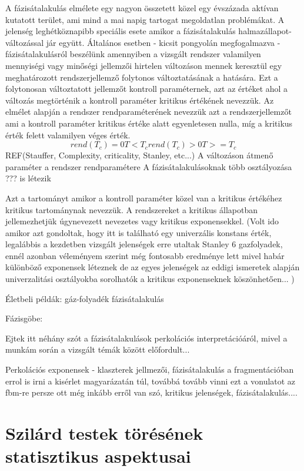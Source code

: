 A fázisátalakulás elmélete egy nagyon összetett közel egy évszázada aktívan kutatott terület, ami mind a mai napig tartogat megoldatlan problémákat. A jelenség leghétköznapibb speciális esete amikor a fázisátalakulás halmazállapot-változással jár együtt. Általános esetben - kicsit pongyolán megfogalmazva - fázisátalakulásról beszélünk amennyiben a vizsgált rendszer valamilyen mennyiségi vagy minőségi jellemzői hirtelen változáson mennek keresztül egy meghatározott rendszerjellemző folytonos változtatásának a hatására. Ezt a folytonosan változtatott jellemzőt kontroll paraméternek, azt az értéket ahol a változás megtörténik a kontroll paraméter kritikus értékének nevezzük. Az elmélet alapján a rendszer rendparaméterének nevezzük azt a rendszerjellemzőt ami a kontroll paraméter kritikus értéke alatt egyenletesen nulla, míg a kritikus érték felett valamilyen véges érték. 
\begin{equation}
 rend(T_c)=0  T<T_c
 rend(T_c)>0  T>=T_c
\end{equation}
 REF(Stauffer, Complexity, criticality, Stanley, etc...)
A változáson átmenő paraméter a rendszer rendparamétere 
A fázisátalakulásoknak több osztályozása ??? is létezik

Azt a tartományt amikor a kontroll paraméter közel van a kritikus értékéhez kritikus tartománynak nevezzük. A rendszereket a kritikus állapotban jellemezhetjük úgynevezett nevezetes vagy kritikus exponensekkel. (Volt ido amikor azt gondoltak, hogy itt is található egy univerzális konstans érték, legalábbis a kezdetben vizsgált jelenségek erre utaltak Stanley 6 gazfolyadek, ennél azonban véleményem szerint még fontosabb eredménye lett mivel habár különböző exponensek léteznek de az egyes jelenségek az eddigi ismeretek alapján univerzalitási osztályokba sorolhatók a kritikus exponenseknek köszönhetően... )

Életbeli példák: gáz-folyadék fázisátalakulás

Fázisgöbe:

Ejtek itt néhány szót a fázisátalakulások perkolációs interpretációáról, mivel a munkám során a vizsgált témák között előfordult...

Perkolációs exponensek - klaszterek jellmezői, fázisátalakulás a fragmentációban errol is irni a  kisérlet magyarázatán túl, továbbá tovább vinni ezt a vonulatot az fbm-re persze ott még inkább erről van szó, kritikus jelenségek, fázisátalakulás....
	
\section{Szilárd testek törésének statisztikus aspektusai}



